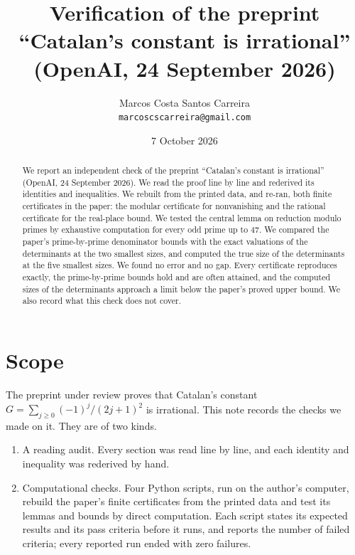 \documentclass[11pt]{article}
\begin{document}
\title{Verification of the preprint ``Catalan's constant is irrational''\\
(OpenAI, 24 September 2026)}
\author{Marcos Costa Santos Carreira\\ \texttt{marcoscscarreira@gmail.com}}
\date{7 October 2026}
\maketitle

\begin{abstract}
We report an independent check of the preprint ``Catalan's constant is irrational'' (OpenAI, 24 September 2026). We read the proof line by line and rederived its identities and inequalities. We rebuilt from the printed data, and re-ran, both finite certificates in the paper: the modular certificate for nonvanishing and the rational certificate for the real-place bound. We tested the central lemma on reduction modulo primes by exhaustive computation for every odd prime up to 47. We compared the paper's prime-by-prime denominator bounds with the exact valuations of the determinants at the two smallest sizes, and computed the true size of the determinants at the five smallest sizes. We found no error and no gap. Every certificate reproduces exactly, the prime-by-prime bounds hold and are often attained, and the computed sizes of the determinants approach a limit below the paper's proved upper bound. We also record what this check does not cover.
\end{abstract}

\section{Scope}

The preprint under review \cite{OAI} proves that Catalan's constant $G=\sum_{j\ge 0}(-1)^j/(2j+1)^2$ is irrational. This note records the checks we made on it. They are of two kinds.

\begin{enumerate}
\item A reading audit. Every section was read line by line, and each identity and inequality was rederived by hand.
\item Computational checks. Four Python scripts, run on the author's computer, rebuild the paper's finite certificates from the printed data and test its lemmas and bounds by direct computation. Each script states its expected results and its pass criteria before it runs, and reports the number of failed criteria; every reported run ended with zero failures.
\end{enumerate}
\end{document}
